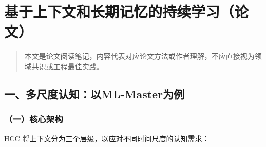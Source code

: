 \clearpage

\hypertarget{ux57faux4e8eux4e0aux4e0bux6587ux548cux957fux671fux8bb0ux5fc6ux7684ux6301ux7eedux5b66ux4e60ux8bbaux6587}{%
\section{基于上下文和长期记忆的持续学习（论文）}\label{ux57faux4e8eux4e0aux4e0bux6587ux548cux957fux671fux8bb0ux5fc6ux7684ux6301ux7eedux5b66ux4e60ux8bbaux6587}}

\begin{quote}
本文是论文阅读笔记，内容代表对应论文方法或作者理解，不应直接视为领域共识或工程最佳实践。
\end{quote}

\hypertarget{ux4e00ux591aux5c3aux5ea6ux8ba4ux77e5ux4ee5ml-masterux4e3aux4f8b}{%
\subsection{一、多尺度认知：以ML-Master为例}\label{ux4e00ux591aux5c3aux5ea6ux8ba4ux77e5ux4ee5ml-masterux4e3aux4f8b}}

\hypertarget{ux4e00ux6838ux5fc3ux67b6ux6784-1}{%
\subsubsection{（一）核心架构}\label{ux4e00ux6838ux5fc3ux67b6ux6784-1}}

HCC 将上下文分为三个层级，以应对不同时间尺度的认知需求：

